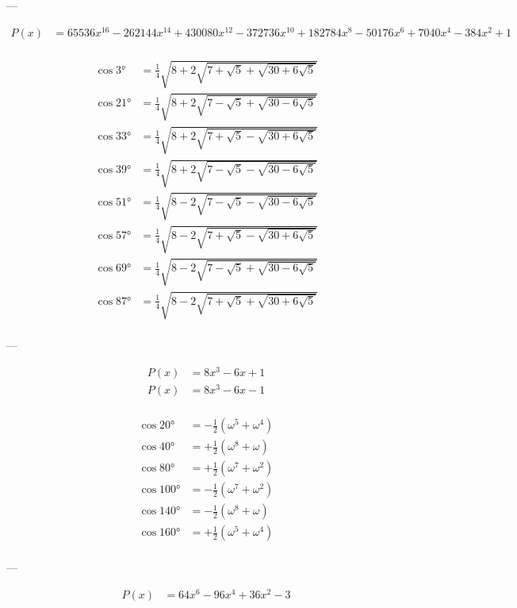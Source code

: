 ---

$$
\begin{aligned}
    P(x) &= 65536 x^{16}-262144 x^{14}+430080 x^{12}-372736 x^{10}+182784 x^8-50176 x^6+7040 x^4-384 x^2+1\\
\end{aligned}
$$

$$
\begin{aligned}
    \cos 3°  &= \frac{1}{4} \sqrt{8+2\sqrt{7+\sqrt{5}+\sqrt{30+6\sqrt{5}}}}\\
    \cos 21° &= \frac{1}{4} \sqrt{8+2\sqrt{7-\sqrt{5}+\sqrt{30-6\sqrt{5}}}}\\
    \cos 33° &= \frac{1}{4} \sqrt{8+2\sqrt{7+\sqrt{5}-\sqrt{30+6\sqrt{5}}}}\\
    \cos 39° &= \frac{1}{4} \sqrt{8+2\sqrt{7-\sqrt{5}-\sqrt{30-6\sqrt{5}}}}\\
    \cos 51° &= \frac{1}{4} \sqrt{8-2\sqrt{7-\sqrt{5}-\sqrt{30-6\sqrt{5}}}}\\
    \cos 57° &= \frac{1}{4} \sqrt{8-2\sqrt{7+\sqrt{5}-\sqrt{30+6\sqrt{5}}}}\\
    \cos 69° &= \frac{1}{4} \sqrt{8-2\sqrt{7-\sqrt{5}+\sqrt{30-6\sqrt{5}}}}\\
    \cos 87° &= \frac{1}{4} \sqrt{8-2\sqrt{7+\sqrt{5}+\sqrt{30+6\sqrt{5}}}}\\
\end{aligned}
$$

---

$$
\begin{aligned}
    P(x) &= 8 x^3-6 x+1\\
    P(x) &= 8 x^3-6 x-1\\
\end{aligned}
$$

$$
\begin{aligned}
    \cos 20°  &= -\frac{1}{2} \left(ω^5+ω^4\right)\\
    \cos 40°  &= +\frac{1}{2} \left(ω^8+ω  \right)\\
    \cos 80°  &= +\frac{1}{2} \left(ω^7+ω^2\right)\\
    \cos 100° &= -\frac{1}{2} \left(ω^7+ω^2\right)\\
    \cos 140° &= -\frac{1}{2} \left(ω^8+ω  \right)\\
    \cos 160° &= +\frac{1}{2} \left(ω^5+ω^4\right)\\
\end{aligned}
$$

---

$$
\begin{aligned}
    P(x) &= 64 x^6-96 x^4+36 x^2-3\\
\end{aligned}
$$

